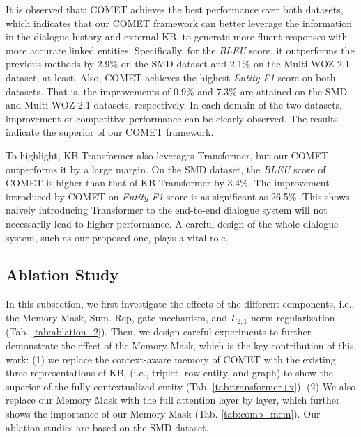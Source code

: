 \documentclass[11pt]{article}
\begin{document}
It is observed that: COMET achieves the best performance over both datasets, which indicates that our COMET framework can better leverage the information in the dialogue history and external KB, to generate more fluent responses with more accurate linked entities. Specifically, for the \textit{BLEU} score, it outperforms the previous methods by 2.9\% on the SMD dataset and 2.1\% on the Multi-WOZ 2.1 dataset, at least. Also, COMET achieves the highest \textit{Entity F1} score on both datasets. That is, the improvements of 0.9\% and 7.3\% are attained on the SMD and Multi-WOZ 2.1 datasets, respectively. In each domain of the two datasets, improvement or competitive performance can be clearly observed. The results indicate the superior of our COMET framework.


To highlight, KB-Transformer \cite{h-2019-kbtransformer} also leverages Transformer, but our COMET outperforms it by a large margin. On the SMD dataset, the \textit{BLEU} score of COMET is higher than that of KB-Transformer by 3.4\%. The improvement introduced by COMET on \textit{Entity F1} score is as significant as 26.5\%. This shows naively introducing Transformer to the end-to-end dialogue system will not necessarily lead to higher performance. A careful design of the whole dialogue system, such as our proposed one, plays a vital role.



\subsection{Ablation Study}
\label{ssec::ablation}
In this subsection, we first investigate the effects of the different components, i.e., the Memory Mask, Sum. Rep, gate mechanism, and $L_{2,1}$-norm regularization (Tab. \ref{tab:ablation_2}). 
Then, we design careful experiments to further demonstrate the effect of the Memory Mask, which is the key contribution of this work:
(1) we replace the context-aware memory of COMET with the existing three representations of KB, (i.e., triplet, row-entity, and graph) to show the superior of the fully contextualized entity (Tab. \ref{tab:transformer+x}).
(2) We also replace our Memory Mask with the full attention layer by layer, which further shows the importance of our Memory Mask (Tab. \ref{tab:comb_mem}).
Our ablation studies are based on the SMD dataset.



\begin{table}[htb]
\centering

\caption{The effects of different components.}
\label{tab:ablation_2}
\end{table}
\end{document}
